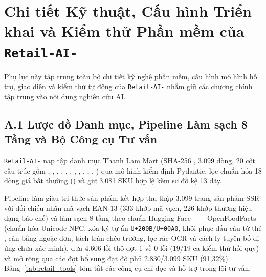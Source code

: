 \appendix

\chapter{Chi tiết Kỹ thuật, Cấu hình Triển khai và Kiểm thử Phần mềm của \texttt{Retail-AI-}}
\label{app:retail_ai}

Phụ lục này tập trung toàn bộ chi tiết kỹ nghệ phần mềm, cấu hình mô hình hỗ trợ, giao diện và kiểm thử tự động của \texttt{Retail-AI-} nhằm giữ các chương chính tập trung vào nội dung nghiên cứu AI.

\section*{A.1 Lược đồ Danh mục, Pipeline Làm sạch 8 Tầng và Bộ Công cụ Tư vấn}
\texttt{Retail-AI-} nạp tập danh mục Thanh Lam Mart (SHA-256 , 3.099 dòng, 20 cột cấu trúc gồm , , , , , , , , , , , ) qua mô hình kiểm định Pydantic, lọc chuẩn hóa 18 dòng giá bất thường () và giữ 3.081 SKU hợp lệ kèm sơ đồ kệ 13 dãy.

Pipeline làm giàu tri thức sản phẩm kết hợp thu thập 3.099 trang sản phẩm SSR với đối chiếu nhãn mã vạch EAN-13 (333 khớp mã vạch, 226 khớp thương hiệu--dạng bào chế) và làm sạch 8 tầng theo chuẩn Hugging Face ~\cite{hf_datatrove} + OpenFoodFacts~\cite{openfoodfacts} (chuẩn hóa Unicode NFC, xóa ký tự ẩn \texttt{U+200B}/\texttt{U+00A0}, khôi phục dấu câu từ thẻ , cân bằng ngoặc đơn, tách tràn chéo trường, lọc rác OCR và cách ly tuyên bố dị ứng chưa xác minh), đưa 4.606 lỗi thô đợt 1 về 0 lỗi (19/19 ca kiểm thử hồi quy) và mở rộng qua các đợt bổ sung đạt độ phủ 2.830/3.099 SKU (91,32\%). Bảng~\ref{tab:retail_tools} tóm tắt các công cụ chỉ đọc và hỗ trợ trong lõi tư vấn.

